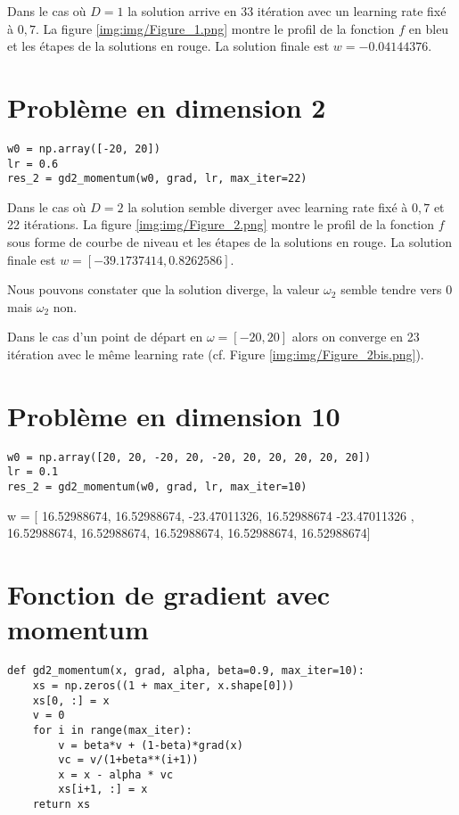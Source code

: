 \documentclass[12pt]{article}
\begin{document}

Dans le cas où $D=1$ la solution arrive en 33 itération avec un learning rate fixé à $0,7$. La figure \ref{img:img/Figure_1.png} montre le profil de la fonction $f$ en bleu et les étapes de la solutions en rouge. La solution finale est $w = -0.04144376$.

\newpage
\section*{Problème en dimension 2}

\begin{lstlisting}
w0 = np.array([-20, 20])
lr = 0.6
res_2 = gd2_momentum(w0, grad, lr, max_iter=22)
\end{lstlisting}


Dans le cas où $D=2$ la solution semble diverger avec learning rate fixé à $0,7$ et 22 itérations. La figure \ref{img:img/Figure_2.png} montre le profil de la fonction $f$ sous forme de courbe de niveau et les étapes de la solutions en rouge. La solution finale est $w = [-39.1737414, 0.8262586]$.

Nous pouvons constater que la solution diverge, la valeur $\omega_2$ semble tendre vers 0 mais $\omega_2$ non.

Dans le cas d'un point de départ en $\omega = [-20, 20]$ alors on converge en 23 itération avec le même learning rate (cf. Figure \ref{img:img/Figure_2bis.png}).


\newpage
\section*{Problème en dimension 10}
\begin{lstlisting}
w0 = np.array([20, 20, -20, 20, -20, 20, 20, 20, 20, 20])
lr = 0.1
res_2 = gd2_momentum(w0, grad, lr, max_iter=10)
\end{lstlisting}

w = [ 16.52988674, 16.52988674, -23.47011326, 16.52988674 -23.47011326
, 16.52988674, 16.52988674, 16.52988674, 16.52988674, 16.52988674]


\newpage
\section*{Fonction de gradient avec momentum}

\begin{lstlisting}
def gd2_momentum(x, grad, alpha, beta=0.9, max_iter=10):
    xs = np.zeros((1 + max_iter, x.shape[0]))
    xs[0, :] = x
    v = 0
    for i in range(max_iter):
        v = beta*v + (1-beta)*grad(x)
        vc = v/(1+beta**(i+1))
        x = x - alpha * vc
        xs[i+1, :] = x
    return xs
\end{lstlisting}
\end{document}
